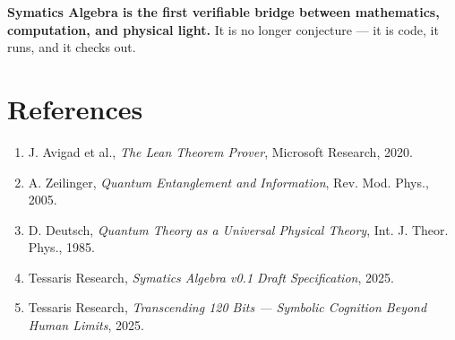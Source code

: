 \documentclass[12pt]{article}
\begin{document}
\textbf{Symatics Algebra is the first verifiable bridge between mathematics, computation, and physical light.}  
It is no longer conjecture — it is code, it runs, and it checks out.

\section*{References}
\begin{enumerate}[noitemsep]
    \item J. Avigad et al., \emph{The Lean Theorem Prover}, Microsoft Research, 2020.
    \item A. Zeilinger, \emph{Quantum Entanglement and Information}, Rev. Mod. Phys., 2005.
    \item D. Deutsch, \emph{Quantum Theory as a Universal Physical Theory}, Int. J. Theor. Phys., 1985.
    \item Tessaris Research, \emph{Symatics Algebra v0.1 Draft Specification}, 2025.
    \item Tessaris Research, \emph{Transcending 120 Bits — Symbolic Cognition Beyond Human Limits}, 2025.
\end{enumerate}
\end{document}
